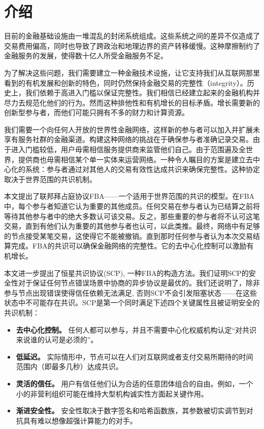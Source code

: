 \section{介绍}

目前的金融基础设施由一堆混乱的封闭系统组成。这些系统之间的差异不仅造成了交易费用偏高，同时也导致了跨政治和地理边界的资产转移缓慢。这种摩擦制约了金融服务的发展，使得数十亿人所受金融服务不足。

为了解决这些问题，我们需要建立一种金融技术设施，让它支持我们从互联网那里看到的有机发展和创新的特色，同时仍然保持金融交易的完整性（integrity）。历史上，我们依赖于高进入门槛以保证完整性。我们相信已经建立起来的金融机构并尽力去规范化他们的行为。然而这种排他性和有机增长的目标矛盾。增长需要新的创新型参与者，而他们可能只拥有不多的财力和计算资源。

我们需要一个向任何人开放的世界性金融网络，这样新的参与者可以加入并扩展未享有服务社群的金融渠道。构建这种网络的挑战在于确保参与者准确记录交易。由于进入门槛较低，用户毋需相信服务提供商来监管他们自己。由于范围遍及全世界，提供商也毋需相信某个单一实体来运营网络。一种令人瞩目的方案是建立去中心化的系统：参与者通过对其他人的交易有效性达成共识来确保完整性。这种协定取决于世界范围的共识机制。

本文提出了联邦拜占庭协议FBA——一个适用于世界范围的共识的模型。在FBA中，每个参与者知道它认为重要的其他成员。任何交易在参与者认为已结算之前将等待其他参与者中的绝大多数认可该交易。反之，那些重要的参与者将不认可这笔交易，直到有他们认为重要的其他参与者也认可，以此类推。最终，网络中有足够的节点接受某笔交易，这使得它不能被撤销。直到那时任何参与者认为本次交易结算完成。FBA的共识可以确保金融网络的完整性。它的去中心化控制可以激励有机增长。

本文进一步提出了恒星共识协议(SCP), 一种FBA的构造方法。我们证明SCP的安全性对于保证任何节点错误场景中协商的异步协议是最优的。我们还说明了，除非参与节点出现错误使得信任依赖无法满足, 否则SCP不会引发阻塞状态——在这些状态中不可能存在共识。SCP是第一个同时满足下述四个关键属性且被证明安全的共识机制：

\begin{itemize}
	\item \textbf{去中心化控制。} 任何人都可以参与，并且不需要中心化权威机构认定``对共识来说谁的认可是必须的''。
	\item \textbf{低延迟。} 实际情形中，节点可以在人们对互联网或者支付交易所期待的时间范围内（即最多几秒）达成共识。
	\item \textbf{灵活的信任。} 用户有信任他们认为合适的任意团体组合的自由。例如，一个小的非营利组织可能在维持大型机构诚实性方面起关键作用。
	\item \textbf{渐进安全性。} 安全性取决于数字签名和哈希函数族，其参数被切实调节到对抗具有难以想像超强计算能力的对手。
\end{itemize}

